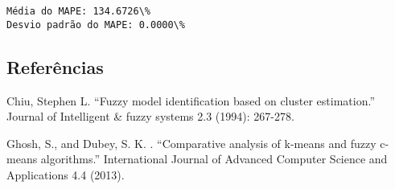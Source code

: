 \documentclass[11pt]{article}
\begin{document}
    \begin{Verbatim}[commandchars=\\\{\}]
Média do MAPE: 134.6726\%
Desvio padrão do MAPE: 0.0000\%
    \end{Verbatim}

    \hypertarget{referuxeancias}{%
\subsection{Referências}\label{referuxeancias}}

Chiu, Stephen L. ``Fuzzy model identification based on cluster
estimation.'' Journal of Intelligent \& fuzzy systems 2.3 (1994):
267-278.

Ghosh, S., and Dubey, S. K. . ``Comparative analysis of k-means and
fuzzy c-means algorithms.'' International Journal of Advanced Computer
Science and Applications 4.4 (2013).


    
    
    
\end{document}
